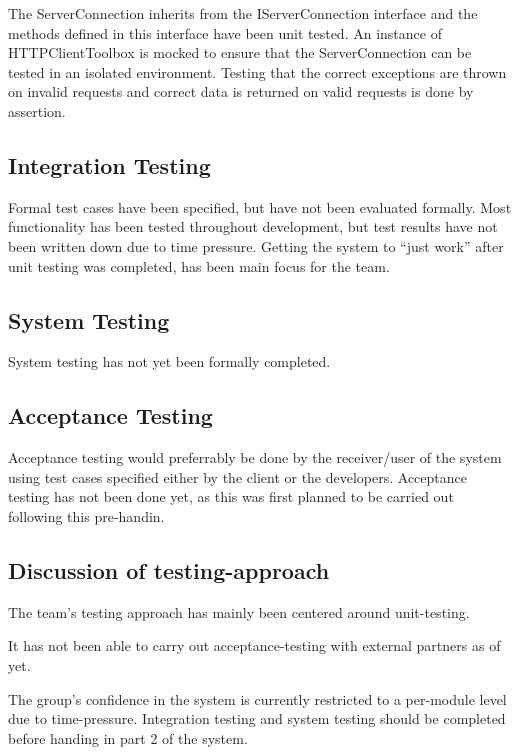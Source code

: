 The ServerConnection inherits from the IServerConnection interface and
the methods defined in this interface have been unit tested. An instance
of HTTPClientToolbox is mocked to ensure that the ServerConnection can
be tested in an isolated environment. Testing that the correct
exceptions are thrown on invalid requests and correct data is returned
on valid requests is done by assertion.

\subsection{Integration Testing}\label{integration-testing}

Formal test cases have been specified, but have not been evaluated
formally. Most functionality has been tested throughout development, but
test results have not been written down due to time pressure. Getting
the system to ``just work'' after unit testing was completed, has been
main focus for the team.

\subsection{System Testing}\label{system-testing}

System testing has not yet been formally completed.

\subsection{Acceptance Testing}\label{acceptance-testing}

Acceptance testing would preferrably be done by the receiver/user of the
system using test cases specified either by the client or the
developers. Acceptance testing has not been done yet, as this was first
planned to be carried out following this pre-handin.

\subsection{Discussion of
testing-approach}\label{discussion-of-testing-approach}

The team's testing approach has mainly been centered around
unit-testing.

It has not been able to carry out acceptance-testing with external
partners as of yet.

The group's confidence in the system is currently restricted to a
per-module level due to time-pressure. Integration testing and system
testing should be completed before handing in part 2 of the system.

